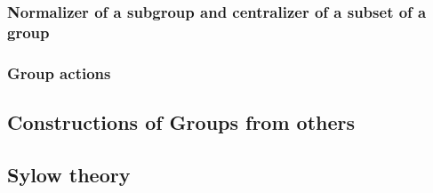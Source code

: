 






\subsubsection{Normalizer of a subgroup and centralizer of a subset of a group}








\subsubsection{Group actions}











\subsection{Constructions of Groups from others}







\subsection{Sylow theory}

